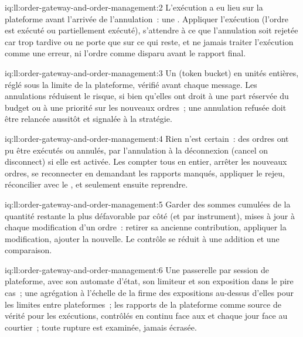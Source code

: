 \begin{solution}{iq:ll:order-gateway-and-order-management:2}
L'exécution a eu lieu sur la plateforme avant l'arrivée de l'annulation~: une . Appliquer l'exécution (l'ordre est exécuté ou
partiellement exécuté), s'attendre à ce que l'annulation soit rejetée car trop tardive ou ne porte que sur ce qui reste, et ne jamais traiter l'exécution comme une
erreur, ni l'ordre comme disparu avant le rapport final.
\end{solution}

\begin{solution}{iq:ll:order-gateway-and-order-management:3}
Un  (token bucket) en unités entières, réglé sous la limite de la plateforme, vérifié avant chaque message. Les annulations réduisent le risque, si bien qu'elles ont droit à
une part réservée du budget ou à une priorité sur les nouveaux ordres~; une annulation refusée doit être relancée aussitôt et signalée à la
stratégie.
\end{solution}

\begin{solution}{iq:ll:order-gateway-and-order-management:4}
Rien n'est certain~: des ordres ont pu être exécutés ou annulés, par l'annulation à la déconnexion (cancel on disconnect) si elle est activée. Les compter tous en entier, arrêter
les nouveaux ordres, se reconnecter en demandant les rapports manqués, appliquer le rejeu, réconcilier avec le , et seulement ensuite reprendre.
\end{solution}

\begin{solution}{iq:ll:order-gateway-and-order-management:5}
Garder des sommes cumulées de la quantité restante la plus défavorable par côté (et par instrument), mises à jour à chaque modification d'un ordre~: retirer sa
ancienne contribution, appliquer la modification, ajouter la nouvelle. Le contrôle se réduit à une addition et une comparaison.
\end{solution}

\begin{solution}{iq:ll:order-gateway-and-order-management:6}
Une passerelle par session de plateforme, avec son automate d'état, son limiteur et son exposition dans le pire cas~; une agrégation à l'échelle de la firme
des expositions au-dessus d'elles pour les limites entre plateformes~; les rapports de la plateforme comme source de vérité pour les exécutions, contrôlés en continu face aux  et chaque jour face au courtier~; toute rupture est examinée, jamais écrasée.
\end{solution}
